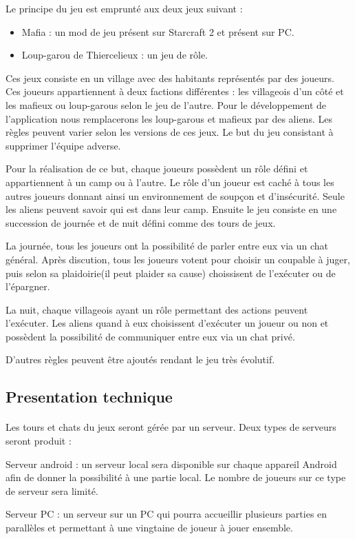 \documentclass[pdftex,12pt,a4paper]{report}
\begin{document}
\textnormal{Le principe du jeu est emprunté aux deux jeux suivant :}
\begin{itemize}
\item  Mafia : un mod de jeu présent sur Starcraft 2 et présent sur PC.
\item Loup-garou de Thiercelieux : un jeu de rôle.
\end{itemize}

\textnormal{
Ces jeux consiste en un village avec des habitants représentés par des joueurs. Ces joueurs appartiennent à deux factions différentes : les villageois d'un côté et les mafieux ou loup-garous selon le jeu de l'autre. Pour le développement de l'application nous remplacerons les loup-garous et mafieux par des aliens. Les règles peuvent varier selon les versions de ces jeux. 
Le but du jeu consistant à supprimer l'équipe adverse.}

\textnormal{
Pour la réalisation de ce but, chaque joueurs possèdent un rôle défini et appartiennent à un camp ou à l'autre. Le rôle d'un joueur est caché à tous les autres joueurs donnant ainsi un environnement de soupçon et d'insécurité. Seule les aliens peuvent savoir qui est dans leur camp. Ensuite le jeu consiste en une succession de journée et de nuit défini comme des tours de jeux. }
\begin{description}
\item \textnormal{La journée, tous les joueurs ont la possibilité de parler entre eux via un chat général. Après discution, tous les joueurs votent pour choisir un coupable à juger, puis selon sa plaidoirie(il peut plaider sa cause) choissisent de l'exécuter ou de l'épargner.}
\item \textnormal{La nuit, chaque villageois ayant un rôle permettant des actions  peuvent l'exécuter. Les aliens quand à eux choisissent d’exécuter un joueur ou non et possèdent la possibilité de communiquer entre eux via un chat privé.}
\end{description}
\textnormal{ D'autres règles peuvent être ajoutés rendant le jeu très évolutif.}

\clearpage

\subsection{Presentation technique}
\paragraph{}
\textnormal{Les tours et chats du jeux seront gérée par un serveur. Deux types de serveurs seront produit :}
\begin{description}
\item \textnormal{ Serveur android : un serveur local sera disponible sur chaque appareil Android afin de donner la possibilité à une partie local. Le nombre de joueurs sur ce type de serveur sera limité.}
\item \textnormal{ Serveur PC : un serveur sur un PC qui pourra accueillir plusieurs parties en parallèles et permettant à une vingtaine de joueur à jouer ensemble. }
\end{description}
\end{document}
